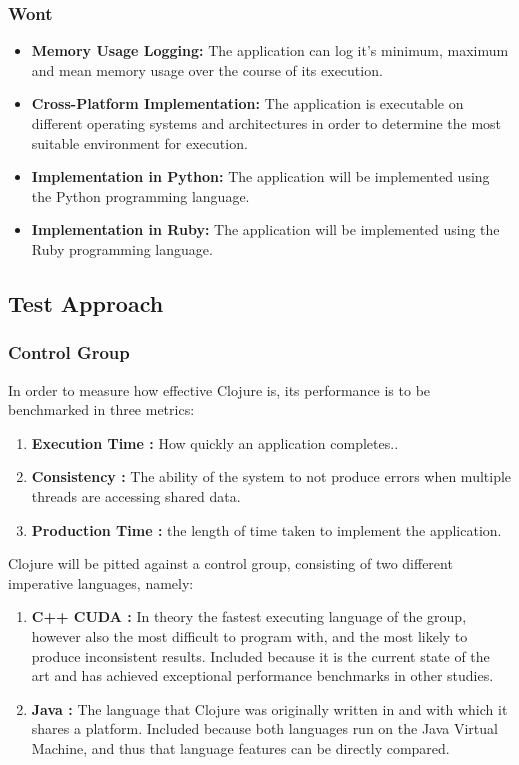 \documentclass[12pt,a4paper]{article}
\begin{document}
\subsubsection{Wont}

\begin{itemize} \itemsep0pt
        \item \textbf{Memory Usage Logging:} The application can log it's minimum, maximum and mean memory usage over the course of its execution.
        \item \textbf{Cross-Platform Implementation:} The application is executable on different operating systems and architectures in order to determine the most suitable environment for execution.
        \item \textbf{Implementation in Python:} The application will be implemented using the Python programming language.
        \item \textbf{Implementation in Ruby:} The application will be implemented using the Ruby programming language.
\end{itemize}


\subsection{Test Approach}

\subsubsection{Control Group}

In order to measure how effective Clojure is, its performance is to be benchmarked in three metrics:

\begin{enumerate} \itemsep0pt
        \item \textbf{Execution Time :} How quickly an application completes..
        \item \textbf{Consistency :} The ability of the system to not produce errors when multiple threads are accessing shared data.
        \item \textbf{Production Time :} the length of time taken to implement the application.
\end{enumerate}

Clojure will be pitted against a control group, consisting of two different imperative languages, namely:

\begin{enumerate} \itemsep0pt
        \item \textbf{C++ CUDA :} In theory the fastest executing language of the group, however also the most difficult to program with, and the most likely to produce inconsistent results. Included because it is the current state of the art and has achieved exceptional performance benchmarks in other studies.
        \item \textbf{Java :} The language that Clojure was originally written in and with which it shares a platform. Included because both languages run on the Java Virtual Machine, and thus  that language features can be directly compared.
\end{enumerate}
\end{document}
